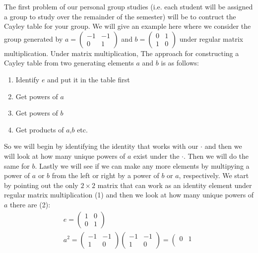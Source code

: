 \begin{example}
\noindent The first problem of our personal group studies (i.e. each student will be assigned a group to study over the remainder of the semester) will be to contruct the Cayley table for your group. We will give an example here where we consider the group generated by $a=\left(\begin{matrix}
-1 & -1 \\
0 & 1 
\end{matrix}\right)$ and $b=\left(\begin{matrix}
0 & 1 \\
1 & 0 
\end{matrix}\right)$ under regular matrix multiplication. Under matrix multiplication, 
The approach for constructing a Cayley table from two generating elements $a$ and $b$ is as follows:
\begin{enumerate}
    \item Identify $e$ and put it in the table first
    \item Get powers of $a$
    \item Get powers of $b$
    \item Get products of $a$,$b$ etc.
\end{enumerate}
So we will begin by identifying the identity that works with our $\cdot$ and then we will look at how many unique powers of $a$ exist under the $\cdot$. Then we will do the same for $b$. Lastly we will see if we can make any more elements by multipying a power of $a$ or $b$ from the left or right by a power of $b$ or $a$, respectively. We start by pointing out the only $2\times 2$ matrix that can work as an identity element under regular matrix multiplication (1) and then we look at how many unique powers of $a$ there are (2):
\begin{align}
    e =\left(\begin{matrix}
1 & 0 \\
0 & 1 
\end{matrix}\right)\nonumber \\
a^2=\left(\begin{matrix}
-1 & -1 \\
1 & 0 
\end{matrix}\right)\left(\begin{matrix}
-1 & -1 \\
1 & 0 
\end{matrix}\right)=\left(\begin{matrix}
0 & 1 \\

\end{matrix}
\end{align}
\end{example}
